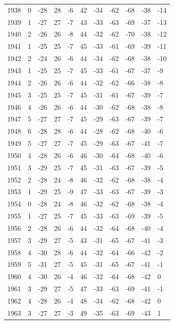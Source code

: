 \begin{table}[H]
\begin{tabular}{lllllllllll}
1938 & 0 & -28 & 28 & -6 & 42 & -34 & -62 & -68 & -38 & -14 \\
1939 & 1 & -27 & 27 & -7 & 43 & -33 & -63 & -69 & -37 & -13 \\
1940 & 2 & -26 & 26 & -8 & 44 & -32 & -62 & -70 & -38 & -12 \\
1941 & 1 & -25 & 25 & -7 & 45 & -33 & -61 & -69 & -39 & -11 \\
1942 & 2 & -24 & 26 & -6 & 44 & -34 & -62 & -68 & -38 & -10 \\
1943 & 1 & -25 & 25 & -7 & 45 & -33 & -61 & -67 & -37 & -9 \\
1944 & 2 & -26 & 26 & -6 & 44 & -32 & -62 & -66 & -38 & -8 \\
1945 & 3 & -25 & 25 & -7 & 45 & -31 & -61 & -67 & -39 & -7 \\
1946 & 4 & -26 & 26 & -6 & 44 & -30 & -62 & -68 & -38 & -8 \\
1947 & 5 & -27 & 27 & -7 & 45 & -29 & -63 & -67 & -39 & -7 \\
1948 & 6 & -28 & 28 & -6 & 44 & -28 & -62 & -68 & -40 & -6 \\
1949 & 5 & -27 & 27 & -7 & 45 & -29 & -63 & -67 & -41 & -7 \\
1950 & 4 & -28 & 26 & -6 & 46 & -30 & -64 & -68 & -40 & -6 \\
1951 & 3 & -29 & 25 & -7 & 45 & -31 & -63 & -67 & -39 & -5 \\
1952 & 2 & -28 & 24 & -8 & 46 & -32 & -62 & -68 & -38 & -4 \\
1953 & 1 & -29 & 25 & -9 & 47 & -33 & -63 & -67 & -39 & -3 \\
1954 & 0 & -28 & 24 & -8 & 46 & -32 & -62 & -68 & -38 & -4 \\
1955 & 1 & -27 & 25 & -7 & 45 & -33 & -63 & -69 & -39 & -5 \\
1956 & 2 & -28 & 26 & -6 & 44 & -32 & -64 & -68 & -40 & -4 \\
1957 & 3 & -29 & 27 & -5 & 43 & -31 & -65 & -67 & -41 & -3 \\
1958 & 4 & -30 & 28 & -6 & 44 & -32 & -64 & -66 & -42 & -2 \\
1959 & 5 & -31 & 27 & -5 & 45 & -31 & -65 & -67 & -41 & -1 \\
1960 & 4 & -30 & 26 & -4 & 46 & -32 & -64 & -68 & -42 & 0 \\
1961 & 3 & -29 & 27 & -5 & 47 & -33 & -63 & -69 & -41 & -1 \\
1962 & 4 & -28 & 26 & -4 & 48 & -34 & -62 & -68 & -42 & 0 \\
1963 & 3 & -27 & 27 & -3 & 49 & -35 & -63 & -69 & -43 & 1 \\

\end{tabular}
\end{table}
